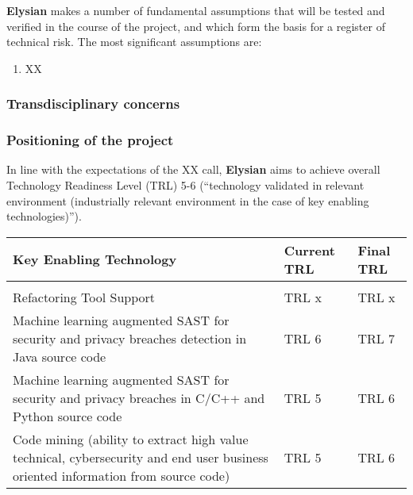 \documentclass[a4paper,11pt]{article}
\newcommand{\project}[1]{\textbf{#1}\xspace}
\newcommand{\SECURITY}{\project{Elysian}}
\newcommand{\TheProject}{\SECURITY}
\begin{document}

\TheProject{} makes a number of fundamental assumptions that will be tested and verified in the course of the project,
and which form the basis for a register of technical risk.  The most significant assumptions are:

\begin{enumerate}[{A}1)]
\item XX
\end{enumerate}

\subsubsection*{Transdisciplinary concerns}


\subsubsection{Positioning of the project}

In line with the expectations of the XX call, \TheProject{} aims
to achieve overall Technology Readiness Level (TRL) 5-6 (``technology
validated in relevant environment (industrially relevant environment in
the case of key enabling technologies)'').

\begin{center}
  \begin{tabular}{|p{4.9in}|l|l|}
    \hline
    \textbf{Key Enabling Technology} & \textbf{Current TRL} & \textbf{Final TRL} \\
    \hline
     &  & \\
    \hline Refactoring Tool Support & TRL x & TRL x \\  
    \hline Machine learning augmented SAST for security and privacy breaches detection in Java source code & TRL 6 & TRL 7 \\  
    \hline Machine learning augmented SAST for security and privacy breaches in C/C++ and Python source code & TRL 5 & TRL 6 \\  
    \hline Code mining (ability to extract high value technical, cybersecurity and end user business oriented information from source code) & TRL 5 & TRL 6 \\  
    \hline
  \end{tabular}
\end{center}
\end{document}
